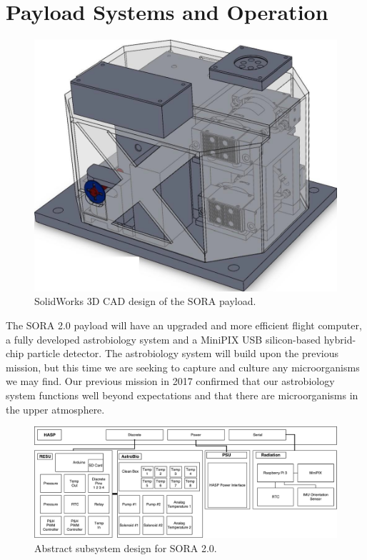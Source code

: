 \section{Payload Systems and Operation}
\label{sec:Hardware}

\begin{figure}[!ht]
\begin{center}
\includegraphics[width=.75\textwidth]{./Figures/payload_1.jpg}
\caption{SolidWorks 3D CAD design of the SORA payload.}
\label{fig:payload} 
\end{center}
\end{figure}

The SORA 2.0 payload will have an upgraded and more efficient flight computer, a fully developed astrobiology system and a MiniPIX USB silicon-based hybrid-chip particle detector.  The astrobiology system will build upon the previous mission, but this time we are seeking to capture and culture any microorganisms we may find.  Our previous mission in 2017 confirmed that our astrobiology system functions well beyond expectations and that there are microorganisms in the upper atmosphere.

\begin{figure}[!ht]
\begin{center}
\includegraphics[width=\textwidth]{./Figures/RESU_2018.pdf}
\caption{Abstract subsystem design for SORA 2.0.}
\label{fig:payload} 
\end{center}
\end{figure}

